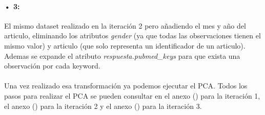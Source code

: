 \paragraph{• 3: } El mismo dataset realizado en la iteración 2 pero añadiendo el mes y año del articulo, eliminando los atributos \textit{gender} (ya que todas las observaciones tienen el mismo valor) y articulo (que solo representa un identificador de un articulo). Ademas se expande el atributo \textit{respuesta.pubmed\_keys} para que exista una observación por cada keyword.

\paragraph{}
Una vez realizado esa transformación ya podemos ejecutar el PCA. Todos los pasos para realizar el PCA se pueden consultar en el anexo () para la iteración 1, el anexo () para la iteración 2 y el anexo () para la iteración 3.